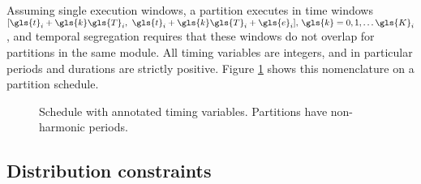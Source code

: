 \documentclass[main.tex]{subfiles}
\begin{document}
Assuming single execution windows, a partition executes in time windows $[ \gls{t}_i+\gls{k}\gls{T}_i,\ \gls{t}_i+\gls{k}\gls{T}_i+\gls{e}_i ],\,\gls{k}=0,1,\ldots\gls{K}_i$, and temporal segregation requires that these windows do not overlap for partitions in the same module.
All timing variables are integers, and in particular periods and durations are strictly positive.
Figure \ref{fig:timing-notation} shows this nomenclature on a partition schedule.

\begin{figure}[htbp]
    \centering
    \resizebox{\linewidth}{!}{}
    \caption{Schedule with annotated timing variables. Partitions have non-harmonic periods.}
    \label{fig:timing-notation}
\end{figure}


\subsection{Distribution constraints}
\end{document}
